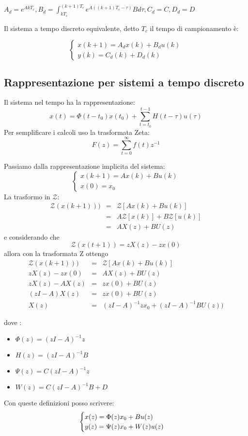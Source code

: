 \documentclass{article}
\begin{document}
\(\displaystyle A_d=e^{AkT_c}, B_d=\int_{kT_c}^{(k+1)T_c} e^{A((k+1)T_c-\tau)}B d\tau , C_d = C,  D_d=D\)

Il sistema a tempo discreto equivalente, detto $T_c$ il tempo di campionamento è:

\[
\begin{cases}
    x(k+1)=A_d x(k)+B_d u(k)\\
    y(k)=C_d (k) + D_d(k)
\end{cases}
\]

\subsection{Rappresentazione per sistemi a tempo discreto}
Il sistema nel tempo ha la rappresentazione:
\[x(t) = \Phi(t-t_0)x(t_0)+\sum_{t=t_0}^{t-1}H(t-\tau)u(\tau)\]
Per semplificare i calcoli uso la trasformata Zeta:
\[F(z) = \sum_{t=0}^{\infty}f(t)z^{-1}\]

Passiamo dalla rappresentazione implicita del sistema:
\[\begin{cases}
    x(k+1)=Ax(k)+Bu(k)\\
    x(0)=x_0
\end{cases}
\]
La trasformo in $\mathcal{Z}$:
\[
    \begin{array}{rcl}
        \mathcal{Z} (x(k+1))) & = & \mathcal{Z} [Ax(k)+Bu(k)] \\
         & = & A\mathcal{Z}[x(k)]+B\mathcal{Z} [u(k)] \\
         & = & AX(z)+BU(z)
    \end{array}    
\]
e considerando che \[ \mathcal{Z}(x(t+1)) = zX(z)-zx(0) \]
allora con la trasformata Z ottengo 
\[
\begin{array}{rcl}
    \mathcal{Z} (x(k+1))) & = & \mathcal{Z} [Ax(k)+Bu(k)] \\
    zX(z)-zx(0) & = & AX(z)+BU(z)\\
    zX(z)-AX(z) & = & zx(0)+BU(z)\\
    (zI-A)X(z) & = & zx(0)+BU(z)\\
    X(z) & = & (zI-A)^{-1}zx_0+(zI-A)^{-1}BU(z))
\end{array}
\]

dove :
\begin{itemize}
    \item $\Phi(z)=(zI-A)^{-1}z$
    \item $H(z)=(zI-A)^{-1}B$
    \item $\Psi(z)=C(zI-A)^{-1}z$
    \item $W(z)=C(zI-A)^{-1}B+D$
\end{itemize}
Con queste definizioni posso scrivere:
\[
\begin{cases}
    x(z)=\Phi(z)x_0+Bu(z)\\
    y(z)=\Psi(z)x_0+W(z)u(z)
\end{cases}\\
\]
\end{document}
